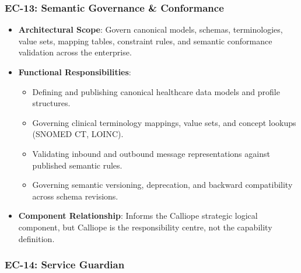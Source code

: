 \label{rad:enterprise:215}
\subsubsection*{EC-13: Semantic Governance \& Conformance}
\label{rad:enterprise:216}

\begin{itemize}

\item
\textbf{Architectural Scope}: Govern canonical models, schemas, terminologies, value sets, mapping tables, constraint rules, and semantic conformance validation across the enterprise.



\item
\textbf{Functional Responsibilities}:


\begin{itemize}

\item
Defining and publishing canonical healthcare data models and profile structures.



\item
Governing clinical terminology mappings, value sets, and concept lookups (SNOMED CT, LOINC).



\item
Validating inbound and outbound message representations against published semantic rules.



\item
Governing semantic versioning, deprecation, and backward compatibility across schema revisions.



\end{itemize}


\item
\textbf{Component Relationship}: Informs the Calliope strategic logical component, but Calliope is the responsibility centre, not the capability definition.



\end{itemize}
\label{rad:enterprise:224}
\subsubsection*{EC-14: Service Guardian}
\label{rad:enterprise:226}

